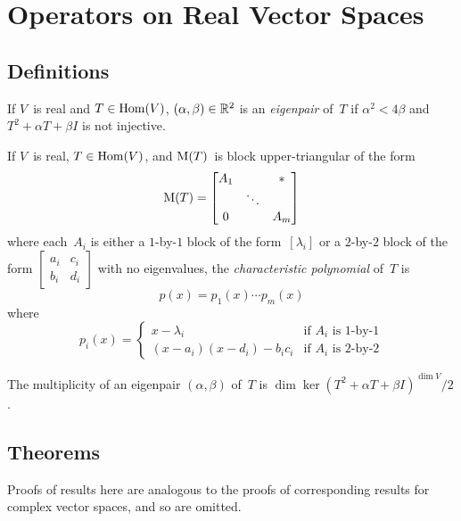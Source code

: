%
%
%
\section{Operators on Real Vector Spaces}
\subsection*{Definitions}
\begin{defn}
If \(V\)~is real and \(T\in\operatorname{Hom}(V)\), \((\alpha,\beta)\in\mathbb{R}^2\) is an \emph{eigenpair} of~\(T\) if \(\alpha^2<4\beta\) and \(T^2+\alpha T+\beta I\) is not injective.
\end{defn}

\begin{defn}
If \(V\)~is real, \(T\in\operatorname{Hom}(V)\), and \(\operatorname{M}(T)\)~is block upper-triangular of the form
\[\operatorname{M}(T)=\left[\begin{matrix}
A_1&&*\\
&\ddots&\\
0&&A_m
\end{matrix}\right]\]
where each~\(A_i\) is either a \(1\)-by-\(1\) block of the form~\([\lambda_i]\) or a \(2\)-by-\(2\) block of the form \(\left[\begin{matrix}a_i&c_i\\b_i&d_i\end{matrix}\right]\) with no eigenvalues, the \emph{characteristic polynomial} of~\(T\) is
\[p(x)=p_1(x)\cdots p_m(x)\]
where
\[p_i(x)=\begin{cases}
x-\lambda_i&\text{if }A_i\text{ is 1-by-1}\\
(x-a_i)(x-d_i)-b_ic_i&\text{if }A_i\text{ is 2-by-2}
\end{cases}\]
\end{defn}

\begin{defn}
The multiplicity of an eigenpair \((\alpha,\beta)\) of~\(T\) is \(\dim\ker(T^2+\alpha T+\beta I)^{\dim V}/2\).
\end{defn}

\subsection*{Theorems}
\begin{rmk}
Proofs of results here are analogous to the proofs of corresponding results for complex vector spaces, and so are omitted.
\end{rmk}

